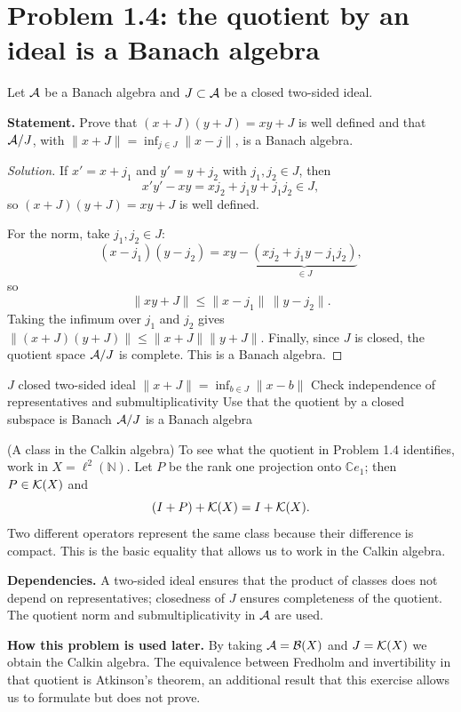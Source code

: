 \section{Problem 1.4: the quotient by an ideal is a Banach algebra}

Let $\mathcal A$ be a Banach algebra and $J\subset\mathcal A$ be a closed two-sided ideal.

\noindent\textbf{Statement.} Prove that $(x+J)(y+J)=xy+J$ is well defined and that $\mathcal A/J$, with $\|x+J\|=\inf_{j\in J}\|x-j\|$, is a Banach algebra.

\begin{proof}[Solution]
If $x'=x+j_1$ and $y'=y+j_2$ with $j_1,j_2\in J$, then
\[
 x'y'-xy=xj_2+j_1y+j_1j_2\in J,
\]
so $(x+J)(y+J)=xy+J$ is well defined.

For the norm, take $j_1,j_2\in J$: 
\[
(x-j_1)(y-j_2)=xy-\underbrace{(xj_2+j_1y-j_1j_2)}_{\in J},
\]
so
\[
\|xy+J\|\le\|x-j_1\|\,\|y-j_2\|.
\]
Taking the infimum over $j_1$ and $j_2$ gives
$\|(x+J)(y+J)\|\le\|x+J\|\|y+J\|$. Finally, since $J$ is closed, the quotient space
$\mathcal A/J$ is complete. This is a Banach algebra.
\end{proof}

\proofdiagrambranch
{$J$ closed two-sided ideal}
{$\|x+J\|=\inf_{b\in J}\|x-b\|$}
{Check independence of representatives and submultiplicativity}
{Use that the quotient by a closed subspace is Banach}
{$\mathcal A/J$ is a Banach algebra}

\begin{cthejemplo}{(A class in the Calkin algebra)}
To see what the quotient in Problem 1.4 identifies, work in $X=\ell^2(\mathbb N)$.
Let $P$ be the rank one projection onto $\mathbb C e_1$; then $P\in\mathcal K(X)$ and
\[
 (I+P)+\mathcal K(X)=I+\mathcal K(X).
\]
Two different operators represent the same class because their difference is compact.
This is the basic equality that allows us to work in the Calkin algebra.
\end{cthejemplo}

\noindent\textbf{Dependencies.} A two-sided ideal ensures that the product of classes does not depend on representatives; closedness of $J$ ensures completeness of the quotient. The quotient norm and submultiplicativity in $\mathcal A$ are used.

\noindent\textbf{How this problem is used later.} By taking $\mathcal A=\mathcal B(X)$ and $J=\mathcal K(X)$ we obtain the Calkin algebra. The equivalence between Fredholm and invertibility in that quotient is Atkinson's theorem, an additional result that this exercise allows us to formulate but does not prove.

